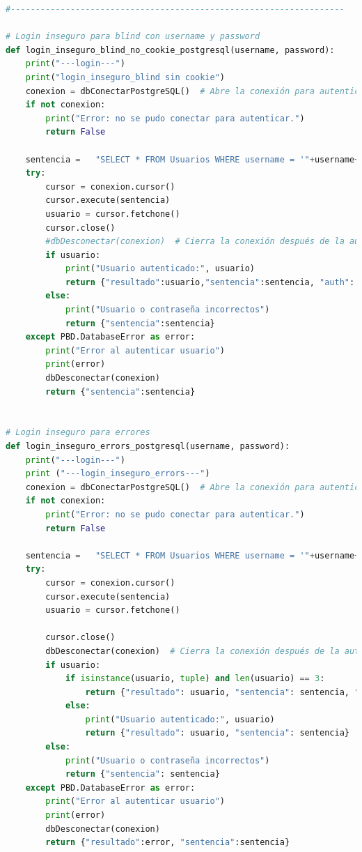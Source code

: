 \documentclass[a4paper,12pt]{article}
\begin{document}
\begin{lstlisting}[language=Python]
#-------------------------------------------------------------------

# Login inseguro para blind con username y password
def login_inseguro_blind_no_cookie_postgresql(username, password):
    print("---login---")
    print("login_inseguro_blind sin cookie")
    conexion = dbConectarPostgreSQL()  # Abre la conexión para autenticación
    if not conexion:
        print("Error: no se pudo conectar para autenticar.")
        return False

    sentencia =   "SELECT * FROM Usuarios WHERE username = '"+username+"' AND password = '"+password+"'"
    try:
        cursor = conexion.cursor()
        cursor.execute(sentencia)
        usuario = cursor.fetchone()
        cursor.close()
        #dbDesconectar(conexion)  # Cierra la conexión después de la autenticación
        if usuario:
            print("Usuario autenticado:", usuario)
            return {"resultado":usuario,"sentencia":sentencia, "auth": "true"}
        else:
            print("Usuario o contraseña incorrectos")
            return {"sentencia":sentencia}
    except PBD.DatabaseError as error:
        print("Error al autenticar usuario")
        print(error)
        dbDesconectar(conexion)
        return {"sentencia":sentencia}


# Login inseguro para errores
def login_inseguro_errors_postgresql(username, password):
    print("---login---")
    print ("---login_inseguro_errors---")
    conexion = dbConectarPostgreSQL()  # Abre la conexión para autenticación
    if not conexion:
        print("Error: no se pudo conectar para autenticar.")
        return False

    sentencia =   "SELECT * FROM Usuarios WHERE username = '"+username+"' AND password = '"+password+"'"
    try:
        cursor = conexion.cursor()
        cursor.execute(sentencia)
        usuario = cursor.fetchone()

        cursor.close()
        dbDesconectar(conexion)  # Cierra la conexión después de la autenticación
        if usuario:
            if isinstance(usuario, tuple) and len(usuario) == 3:
                return {"resultado": usuario, "sentencia": sentencia, "auth": "true"}
            else:
                print("Usuario autenticado:", usuario)
                return {"resultado": usuario, "sentencia": sentencia}
        else:
            print("Usuario o contraseña incorrectos")
            return {"sentencia": sentencia}
    except PBD.DatabaseError as error:
        print("Error al autenticar usuario")
        print(error)
        dbDesconectar(conexion)
        return {"resultado":error, "sentencia":sentencia}


\end{lstlisting}
\end{document}

